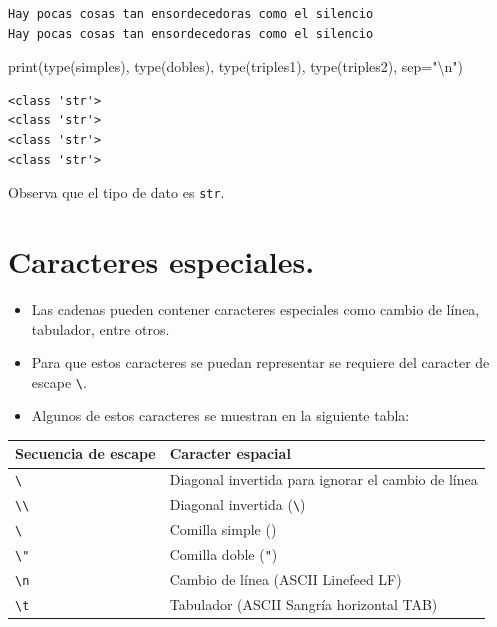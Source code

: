 \documentclass[
  spanish,
  letterpaper,
]{scrbook}
\newenvironment{Shaded}{\begin{snugshade}}{\end{snugshade}}
\newcommand{\BuiltInTok}[1]{\textcolor[rgb]{0.00,0.23,0.31}{#1}}
\newcommand{\CharTok}[1]{\textcolor[rgb]{0.13,0.47,0.30}{#1}}
\newcommand{\NormalTok}[1]{\textcolor[rgb]{0.00,0.23,0.31}{#1}}
\newcommand{\OperatorTok}[1]{\textcolor[rgb]{0.37,0.37,0.37}{#1}}
\newcommand{\StringTok}[1]{\textcolor[rgb]{0.13,0.47,0.30}{#1}}
\theoremstyle{definition}
\theoremstyle{remark}
\begin{document}
\begin{verbatim}
Hay pocas cosas tan ensordecedoras como el silencio
Hay pocas cosas tan ensordecedoras como el silencio
\end{verbatim}

\begin{Shaded}
\begin{Highlighting}[]
\BuiltInTok{print}\NormalTok{(}\BuiltInTok{type}\NormalTok{(simples), }\BuiltInTok{type}\NormalTok{(dobles), }\BuiltInTok{type}\NormalTok{(triples1), }\BuiltInTok{type}\NormalTok{(triples2), sep}\OperatorTok{=}\StringTok{"}\CharTok{\textbackslash{}n}\StringTok{"}\NormalTok{)}
\end{Highlighting}
\end{Shaded}

\begin{verbatim}
<class 'str'>
<class 'str'>
<class 'str'>
<class 'str'>
\end{verbatim}

Observa que el tipo de dato es \texttt{str}.

\section{Caracteres especiales.}\label{caracteres-especiales.}

\begin{itemize}
\item
  Las cadenas pueden contener caracteres especiales como cambio de
  línea, tabulador, entre otros.
\item
  Para que estos caracteres se puedan representar se requiere del
  caracter de escape \texttt{\textbackslash{}}.
\item
  Algunos de estos caracteres se muestran en la siguiente tabla:
\end{itemize}

\begin{longtable}[]{@{}ll@{}}
\toprule\noalign{}
Secuencia de escape & Caracter espacial \\
\midrule\noalign{}
\endhead
\bottomrule\noalign{}
\endlastfoot
\texttt{\textbackslash{}} & Diagonal invertida para ignorar el cambio de
línea \\
\texttt{\textbackslash{}\textbackslash{}} & Diagonal invertida
(\texttt{\textbackslash{}}) \\
\texttt{\textbackslash{}\textquotesingle{}} & Comilla simple
(\texttt{\textquotesingle{}}) \\
\texttt{\textbackslash{}"} & Comilla doble (\texttt{"}) \\
\texttt{\textbackslash{}n} & Cambio de línea (ASCII Linefeed LF) \\
\texttt{\textbackslash{}t} & Tabulador (ASCII Sangría horizontal TAB) \\
\end{longtable}
\end{document}
